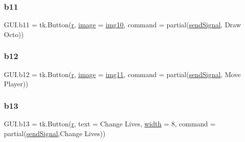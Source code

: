 \mbox{\label{namespace_g_u_i_a737db9240917cd4bce0a7f294b6038b2}} 
\subsubsection{\texorpdfstring{b11}{b11}}
{\footnotesize\ttfamily G\+U\+I.\+b11 = tk.\+Button(\mbox{\hyperlink{_s_d_l__opengl_8h_a42ce7cdc612e53abee15043f80220d97}{r}}, \mbox{\hyperlink{_s_d_l__opengl_8h_a0a221b005894579fea3b9eb7bfc2ee71}{image}} = \mbox{\hyperlink{namespace_g_u_i_ae7bae4d0c7bb1a98517fed2294b60f46}{img10}}, command = partial(\mbox{\hyperlink{namespace_g_u_i_ae82f740e6453cdd542b52ede1560c2c3}{send\+Signal}}, \textquotesingle{}Draw Octo\textquotesingle{}))}

\mbox{\label{namespace_g_u_i_af2a2606c0440d1c893c60b4d6d4fbec5}} 
\subsubsection{\texorpdfstring{b12}{b12}}
{\footnotesize\ttfamily G\+U\+I.\+b12 = tk.\+Button(\mbox{\hyperlink{_s_d_l__opengl_8h_a42ce7cdc612e53abee15043f80220d97}{r}}, \mbox{\hyperlink{_s_d_l__opengl_8h_a0a221b005894579fea3b9eb7bfc2ee71}{image}} = \mbox{\hyperlink{namespace_g_u_i_a54eba3e54367f4dc592947bf19468e7f}{img11}}, command = partial(\mbox{\hyperlink{namespace_g_u_i_ae82f740e6453cdd542b52ede1560c2c3}{send\+Signal}}, \textquotesingle{}Move Player\textquotesingle{}))}

\mbox{\label{namespace_g_u_i_a70f8a6b3e40fa679f0be933103c4e3c1}} 
\subsubsection{\texorpdfstring{b13}{b13}}
{\footnotesize\ttfamily G\+U\+I.\+b13 = tk.\+Button(\mbox{\hyperlink{_s_d_l__opengl_8h_a42ce7cdc612e53abee15043f80220d97}{r}}, text = \textquotesingle{}Change Lives\textquotesingle{}, \mbox{\hyperlink{_s_d_l__opengl_8h_a9a82cf3caff84cabc4598e2619faac17}{width}} = 8, command = partial(\mbox{\hyperlink{namespace_g_u_i_ae82f740e6453cdd542b52ede1560c2c3}{send\+Signal}},\textquotesingle{}Change Lives\textquotesingle{}))}

\mbox{\label{namespace_g_u_i_aa59d8fa69f7030816bf471c883ccf8fc}} 
